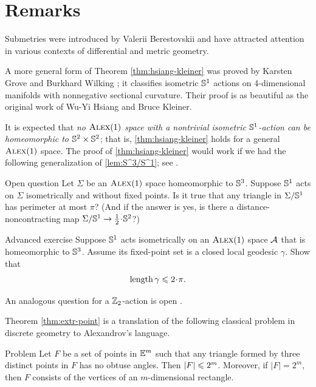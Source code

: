 \section{Remarks}

Submetries were introduced by Valerii Berestovskii \cite{berestovskii1987} and have attracted attention in various contexts of differential and metric geometry.



A more general form of Theorem \ref{thm:hsiang-kleiner} was proved by Karsten Grove and Burkhard Wilking \cite{grove-wilking};
it classifies isometric $\mathbb{S}^1$ actions on 4-dimensional manifolds with nonnegative sectional curvature.
Their proof is as beautiful as the original work of Wu-Yi Hsiang and Bruce Kleiner.

It is expected that \textit{no $\textup{\textsc{Alex}}(1)$ space with a nontrivial isometric $\mathbb{S}^1$-action can be homeomorphic to $\mathbb{S}^2\times\mathbb{S}^2$};
that is, \ref{thm:hsiang-kleiner} holds for a general $\textup{\textsc{Alex}}(1)$ space.
The proof of \ref{thm:hsiang-kleiner} would work if we had the following generalization of \ref{lem:S^3/S^1};
see \cite{harvey-searle}.

\begin{thm}{Open question}
Let $\Sigma$ be an $\textup{\textsc{Alex}}(1)$ space homeomorphic to $\mathbb{S}^3$.
Suppose $\mathbb{S}^1$ acts on $\Sigma$ isometrically and without fixed points.
Is it true that any triangle in $\Sigma/\mathbb{S}^1$ has perimeter at most $\pi$?
(And if the answer is yes, is there a distance-noncontracting map $\Sigma/\SSS^1\z\to \tfrac12\cdot\SSS^2$?)
\end{thm}

{\sloppy

\begin{thm}{Advanced exercise}\label{ex:S1actsS3}
Suppose $\mathbb{S}^1$ acts isometrically on an $\textup{\textsc{Alex}}(1)$ space $\mathcal{A}$ that is homeomorphic to $\mathbb{S}^3$.
Assume its fixed-point set is a closed local geodesic $\gamma$.
Show that
\[\length\gamma\le2\cdot\pi.\]
\end{thm}

}

An analogous question for a $\mathbb{Z}_2$-action is open \cite{petrunin-involution}.

Theorem \ref{thm:extr-point} is a translation of the following classical problem in discrete geometry to Alexandrov's language.

\begin{thm}{Problem}\label{erdos-problem}
Let $F$ be a set of points in $\mathbb{E}^m$ such that any triangle formed by three distinct points in $F$ has no obtuse angles.
Then $|F|\z\le2^m$.
Moreover, if $|F|=2^m$, then $F$ consists of the vertices of an $m$-dimensional rectangle.
\end{thm}

